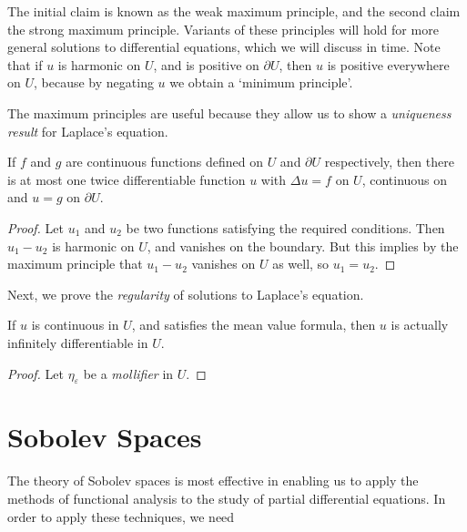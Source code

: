The initial claim is known as the weak maximum principle, and the second claim the strong maximum principle. Variants of these principles will hold for more general solutions to differential equations, which we will discuss in time. Note that if $u$ is harmonic on $U$, and is positive on $\partial U$, then $u$ is positive everywhere on $U$, because by negating $u$ we obtain a `minimum principle'.

The maximum principles are useful because they allow us to show a {\it uniqueness result} for Laplace's equation.

\begin{theorem}
    If $f$ and $g$ are continuous functions defined on $U$ and $\partial U$ respectively, then there is at most one twice differentiable function $u$ with $\Delta u = f$ on $U$, continuous on  and $u = g$ on $\partial U$.
\end{theorem}
\begin{proof}
    Let $u_1$ and $u_2$ be two functions satisfying the required conditions. Then $u_1 - u_2$ is harmonic on $U$, and vanishes on the boundary. But this implies by the maximum principle that $u_1 - u_2$ vanishes on $U$ as well, so $u_1 = u_2$.
\end{proof}

Next, we prove the {\it regularity} of solutions to Laplace's equation.

\begin{theorem}
    If $u$ is continuous in $U$, and satisfies the mean value formula, then $u$ is actually infinitely differentiable in $U$.
\end{theorem}
\begin{proof}
    Let $\eta_\varepsilon$ be a {\it mollifier} in $U$. 
\end{proof}









\chapter{Sobolev Spaces}

The theory of Sobolev spaces is most effective in enabling us to apply the methods of functional analysis to the study of partial differential equations. In order to apply these techniques, we need 









